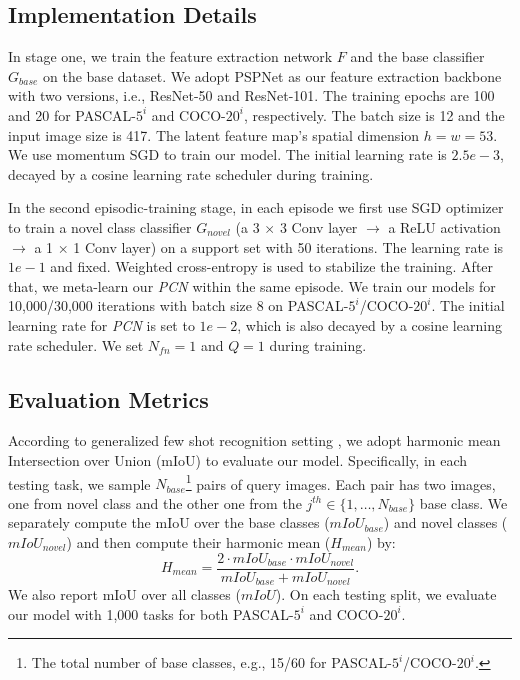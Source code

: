 \documentclass[journal]{IEEEtran}
\begin{document}
\subsection{Implementation Details} In stage one, we train the feature extraction network $F$ and the base classifier $G_{base}$ on the base dataset. We adopt PSPNet \cite{zhao2017pyramid} as our feature extraction backbone with two versions, i.e., ResNet-50 and ResNet-101.
The training epochs are 100 and 20 for PASCAL-$5^{i}$ and COCO-$20^{i}$, respectively. 
The batch size is 12 and the input image size is 417. The latent feature map's spatial dimension $h=w=53$. We use momentum SGD to train our model. 
The initial learning rate is $2.5e-3$, decayed by a cosine learning rate scheduler during training. 

In the second episodic-training stage, in each episode we first use SGD optimizer to train a novel class classifier $G_{novel}$ (a 3 $\times$ 3 Conv layer $\rightarrow$ a ReLU activation $\rightarrow$ a 1 $\times$ 1 Conv layer) on a support set with 50 iterations. 
The learning rate is  $1e-1$ and fixed. 
Weighted cross-entropy is used to stabilize the training. 
After that, we meta-learn our \textit{PCN} within the same episode.
We train our models for 10,000/30,000 iterations with batch size 8 on PASCAL-$5^{i}$/COCO-$20^{i}$. The initial learning rate for \textit{PCN} is set to $1e-2$, which is also decayed by a cosine learning rate scheduler. 
We set $N_{fn}=1$ and $Q=1$ during training.

\subsection{Evaluation Metrics}

According to generalized few shot recognition setting \cite{gidaris2018dynamic,ye2021learning}, we adopt harmonic mean Intersection over Union (mIoU) to evaluate our model. 
Specifically, in each testing task, we sample $N_{base}$\footnote{The total number of base classes, e.g., 15/60 for PASCAL-$5^{i}$/COCO-$20^{i}$.} pairs of query images. 
Each pair has two images, one from novel class and the other one from the $j^{th} \in \{ 1,\dots, N_{base}\}$ base class. 
We separately compute the mIoU over the base classes ($mIoU_{base}$) and novel classes ($mIoU_{novel}$) and then compute their harmonic mean ($H_{mean}$) by:
\begin{equation}
    H_{mean} = \frac{2 \cdot mIoU_{base} \cdot mIoU_{novel}}{mIoU_{base} + mIoU_{novel}}.
\end{equation}
We also report mIoU over all classes ($mIoU$).
On each testing split, we evaluate our model with 1,000 tasks for both PASCAL-$5^{i}$ and COCO-$20^{i}$. 
\end{document}
